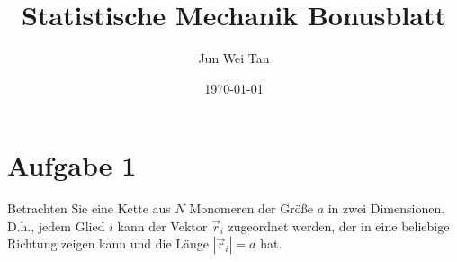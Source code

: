 \documentclass[prb,12pt]{revtex4-2}
\theoremstyle{definition}
\theoremstyle{definition}
\begin{document}
\title{Statistische Mechanik Bonusblatt}
	\author{Jun Wei Tan}
	\date{\today}
	\maketitle
\tableofcontents

\section{Aufgabe 1}
Betrachten Sie eine Kette aus \( N \) Monomeren der Größe \( a \) in zwei Dimensionen. D.h., jedem Glied \( i \) kann der Vektor \( \vec{r}_i \) zugeordnet werden, der in eine beliebige Richtung zeigen kann und die Länge \( |\vec{r}_i| = a \) hat.
\end{document}
